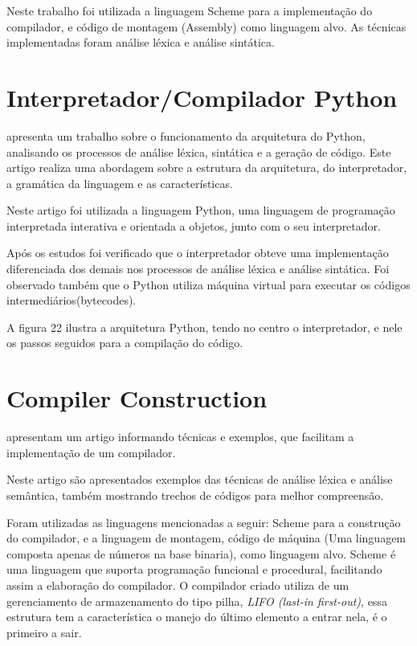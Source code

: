 \documentclass[12pt,oneside,a4paper,chapter=TITLE,section=TITLE,sumario=tradicional]{abntex2}
\begin{document}
Neste trabalho foi utilizada a linguagem Scheme para a implementação do compilador, e código de montagem (Assembly) como linguagem alvo. As técnicas implementadas foram análise léxica e análise sintática.

\section{ Interpretador/Compilador Python}
\label{sec:interpretador-compilador}

\cite{eduardo2010} apresenta um trabalho sobre o funcionamento da arquitetura do Python, analisando os processos de análise léxica, sintática e a geração de código. Este artigo realiza uma abordagem sobre a estrutura da arquitetura, do interpretador, a gramática da linguagem e as características.
 
Neste artigo foi utilizada a linguagem Python, uma linguagem de programação interpretada interativa e orientada a objetos, junto com o seu interpretador.

Após os estudos foi verificado que o interpretador obteve uma implementação diferenciada dos demais nos processos de análise léxica e análise sintática. Foi observado também que o Python utiliza máquina virtual para executar os códigos intermediários(bytecodes).

A figura 22 ilustra a arquitetura Python, tendo no centro o interpretador, e nele os passos seguidos para a compilação do código.

\begin{figure}[htb]
\end{figure}

\section{ Compiler Construction}
\label{sec:compiler-construction}

\cite{aastha2013} apresentam um artigo informando técnicas e exemplos, que facilitam a implementação de um compilador. 

Neste artigo são apresentados exemplos das técnicas de análise léxica e análise semântica, também mostrando trechos de códigos para melhor compreensão.

Foram utilizadas as linguagens mencionadas a seguir: Scheme para a construção do compilador, e a linguagem de montagem, código de máquina (Uma linguagem composta apenas de números na base binaria), como linguagem alvo. Scheme é uma linguagem que suporta programação funcional e procedural, facilitando assim a elaboração do compilador. O compilador criado utiliza de um gerenciamento de armazenamento do tipo pilha, \textit{LIFO (last-in first-out)}, essa estrutura tem a característica o manejo do último elemento a entrar nela, é o primeiro a sair.
\end{document}
